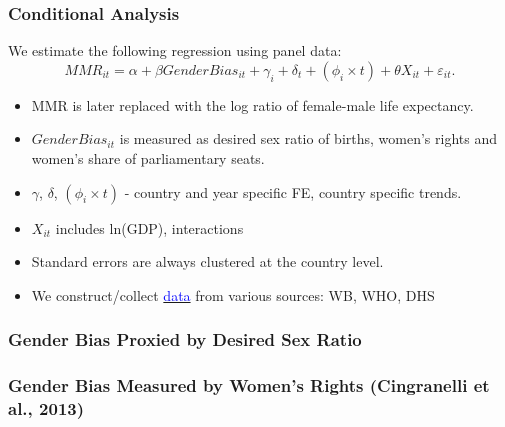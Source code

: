 \documentclass[10pt,letterpaper,subeqn]{beamer}
\begin{document}
\begin{frame}[label=CC]
\frametitle{Conditional Analysis}
We estimate the following regression using panel data:
	\begin{equation}
		MMR_{it} = \alpha + \beta GenderBias_{it} + \gamma_i + \delta_t + 
               (\phi_i\times t) + \theta X_{it} + \varepsilon_{it}. \nonumber
	\end{equation}
\begin{itemize}
	\item MMR is later replaced with the log ratio of female-male life expectancy.
  \item $GenderBias_{it}$ is measured as desired sex ratio of births, women's 
        rights and women's share of parliamentary seats.
	\item $\gamma$, $\delta$, $(\phi_i\times t)$ - country and year specific FE,
        country specific trends.  
  \item $X_{it}$ includes ln(GDP), interactions
	\item Standard errors are always clustered at the country level.
  \item We construct/collect \hyperlink{DSR}{\textcolor{blue}{data}} from various
        sources: WB, WHO, DHS
\end{itemize}
\end{frame}

\begin{frame}
\frametitle{Gender Bias Proxied by Desired Sex Ratio}

\end{frame}

\begin{frame}
\frametitle{Gender Bias Measured by Women's Rights (Cingranelli et al., 2013)}

\end{frame}
\end{document}
